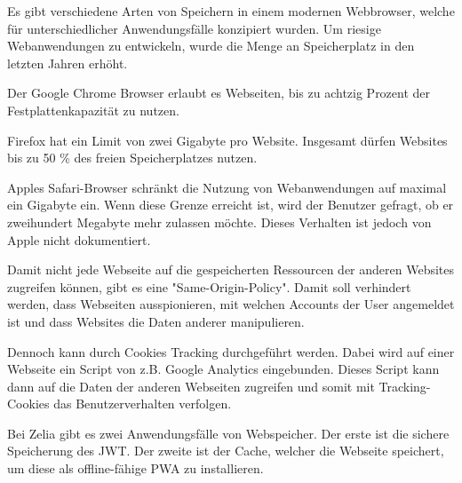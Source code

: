 

Es gibt verschiedene Arten von Speichern in einem modernen Webbrowser, welche für unterschiedlicher Anwendungsfälle konzipiert wurden. Um riesige Webanwendungen zu entwickeln, wurde die Menge an Speicherplatz in den letzten Jahren erhöht. 


Der Google Chrome Browser erlaubt es Webseiten, bis zu achtzig Prozent der Festplattenkapazität zu nutzen.

Firefox hat ein Limit von zwei Gigabyte pro Website. Insgesamt dürfen Websites bis zu 50 \% des freien Speicherplatzes nutzen.

Apples Safari-Browser schränkt die Nutzung von Webanwendungen auf maximal ein Gigabyte ein. Wenn diese Grenze erreicht ist, wird der Benutzer gefragt, ob er zweihundert Megabyte mehr zulassen möchte. Dieses Verhalten ist jedoch von Apple nicht dokumentiert.


Damit nicht jede Webseite auf die gespeicherten Ressourcen der anderen Websites zugreifen können, gibt es eine "Same-Origin-Policy". Damit soll verhindert werden, dass Webseiten ausspionieren, mit welchen Accounts der User angemeldet ist und dass Websites die Daten anderer manipulieren.

Dennoch kann durch Cookies Tracking durchgeführt werden. Dabei wird auf einer Webseite ein Script von z.B. Google Analytics eingebunden. Dieses Script kann dann auf die Daten der anderen Webseiten zugreifen und somit mit Tracking-Cookies das Benutzerverhalten verfolgen.











Bei Zelia gibt es zwei Anwendungsfälle von Webspeicher. Der erste ist die sichere Speicherung des JWT. Der zweite ist der Cache, welcher die Webseite speichert, um diese als offline-fähige PWA zu installieren.

